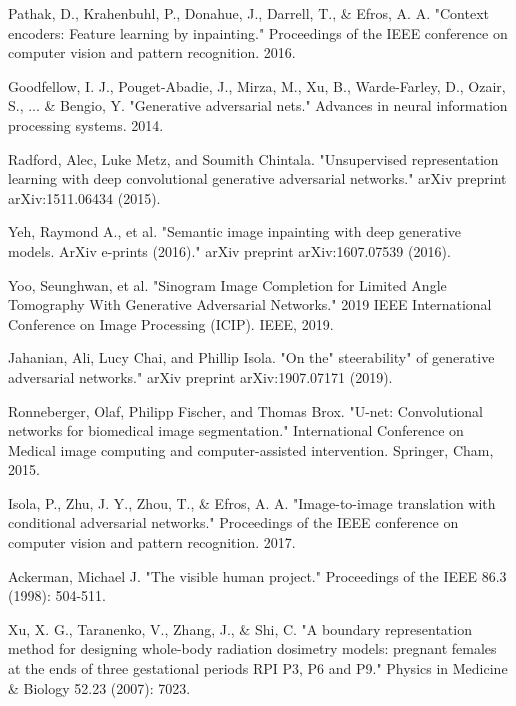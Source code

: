 \begin{thebibliography}{00}

Pathak, D., Krahenbuhl, P., Donahue, J., Darrell, T., \& Efros, A. A. "Context encoders: Feature learning by inpainting." Proceedings of the IEEE conference on computer vision and pattern recognition. 2016.

Goodfellow, I. J., Pouget-Abadie, J., Mirza, M., Xu, B., Warde-Farley, D., Ozair, S., ... \& Bengio, Y. "Generative adversarial nets." Advances in neural information processing systems. 2014. 

Radford, Alec, Luke Metz, and Soumith Chintala. "Unsupervised representation learning with deep convolutional generative adversarial networks." arXiv preprint arXiv:1511.06434 (2015).


 Yeh, Raymond A., et al. "Semantic image inpainting with deep generative models. ArXiv e-prints (2016)." arXiv preprint arXiv:1607.07539 (2016).

 Yoo, Seunghwan, et al. "Sinogram Image Completion for Limited Angle Tomography With Generative Adversarial Networks." 2019 IEEE International Conference on Image Processing (ICIP). IEEE, 2019.

Jahanian, Ali, Lucy Chai, and Phillip Isola. "On the" steerability" of generative adversarial networks." arXiv preprint arXiv:1907.07171 (2019).

Ronneberger, Olaf, Philipp Fischer, and Thomas Brox. "U-net: Convolutional networks for biomedical image segmentation." International Conference on Medical image computing and computer-assisted intervention. Springer, Cham, 2015.

Isola, P., Zhu, J. Y., Zhou, T., \& Efros, A. A. "Image-to-image translation with conditional adversarial networks." Proceedings of the IEEE conference on computer vision and pattern recognition. 2017.

Ackerman, Michael J. "The visible human project." Proceedings of the IEEE 86.3 (1998): 504-511.

Xu, X. G., Taranenko, V., Zhang, J., \& Shi, C. "A boundary representation method for designing whole-body radiation dosimetry models: pregnant females at the ends of three gestational periods RPI P3, P6 and P9." Physics in Medicine \& Biology 52.23 (2007): 7023.


\end{thebibliography}
